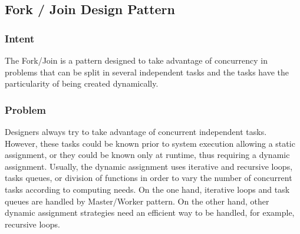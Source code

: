 %
%
%
%

\subsection{Fork / Join Design Pattern}

\subsubsection{Intent}

The Fork/Join is a pattern designed to take advantage of concurrency in problems that can be split in several independent tasks and the tasks have the particularity of being created dynamically. 

\subsubsection{Problem}

Designers always try to take advantage of concurrent independent tasks. However, these tasks could be known prior to system execution allowing a static assignment, or they could be known only at runtime, thus requiring a dynamic assignment. Usually, the dynamic assignment uses iterative and recursive loops, tasks queues, or division of functions in order to vary the number of concurrent tasks according to computing needs. On the one hand, iterative loops and task queues are handled by Master/Worker pattern. On the other hand, other dynamic assignment strategies need an efficient way to be handled, for example, recursive loops.

